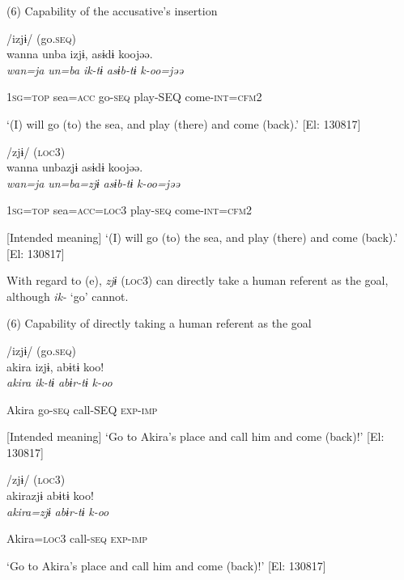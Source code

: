 (6)  Capability of the accusative’s insertion

 \ea /izjɨ/ (go.\textsc{seq})\\
{\TM}
\gll  wanna  unba  izjɨ,  asɨdɨ  koojəə.\\

      \textit{wan=ja}  \textit{un=ba}  \textit{ik-tɨ}  \textit{asɨb-tɨ}  \textit{k-oo=jəə}

      1\textsc{sg}=\textsc{top}  sea=\textsc{acc}  go-\textsc{seq}  play-SEQ  come-\textsc{int}=\textsc{cfm}2

\glt ‘(I) will go (to) the sea, and play (there) and come (back).’ [El: 130817]

 \ex /zjɨ/ (\textsc{loc}3)\\
{\TM}
\gll  *wanna  unbazjɨ  asɨdɨ  koojəə.\\

      \textit{wan=ja}  \textit{un=ba=zjɨ}  \textit{asɨb-tɨ}  \textit{k-oo=jəə}

      1\textsc{sg}=\textsc{top}  sea=\textsc{acc}=\textsc{loc}3  play-\textsc{seq}  come-\textsc{int}=\textsc{cfm}2

      [Intended meaning] ‘(I) will go (to) the sea, and play (there) and come (back).’ [El: 130817]

With regard to (e), \textit{zjɨ} (\textsc{loc}3) can directly take a human referent as the goal, although \textit{ik-} ‘go’ cannot.

(6)  Capability of directly taking a human referent as the goal

 \ea /izjɨ/ (go.\textsc{seq})\\
{\TM}
\gll  *akira  izjɨ,  abɨtɨ  koo!\\

      \textit{akira}  \textit{ik-tɨ}  \textit{abɨr-tɨ}  \textit{k-oo}

      Akira  go-\textsc{seq}  call-SEQ  \textsc{exp}-\textsc{imp}

       [Intended meaning] ‘Go to Akira’s place and call him and come (back)!’ [El: 130817]

 \ex /zjɨ/ (\textsc{loc}3)\\
{\TM}
\gll  akirazjɨ  abɨtɨ  koo!\\

      \textit{akira=zjɨ}  \textit{abɨr-tɨ}  \textit{k-oo}

      Akira=\textsc{loc}3  call-\textsc{seq}  \textsc{exp}-\textsc{imp}

 \glt ‘Go to Akira’s place and call him and come (back)!’ [El: 130817]

